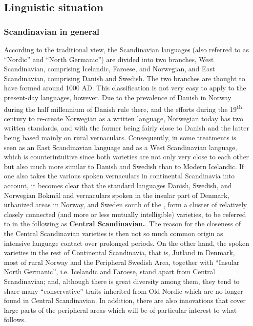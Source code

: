 \subsection[]{\rmfamily }
\clearpage\subsection[Linguistic situation]{\rmfamily Linguistic situation}
\subsubsection[Scandinavian in general]{\rmfamily Scandinavian in general}
According to the traditional view, the Scandinavian languages (also referred to as “Nordic” and “North Germanic”) are divided into two branches, West Scandinavian, comprising Icelandic, Faroese, and Norwegian, and East Scandinavian, comprising Danish and Swedish. The two branches are thought to have formed around 1000 AD. This classification is not very easy to apply to the present-day languages, however. Due to the prevalence of Danish in Norway during the half millennium of Danish rule there, and the efforts during the 19\textsuperscript{th} century to re-create Norwegian as a written language, Norwegian today has two written standards,  and  with the former being fairly close to Danish and the latter being based mainly on rural vernaculars. Consequently, in some treatments  is seen as an East Scandinavian language and  as a West Scandinavian language, which is counterintuitive since both varieties are not only very close to each other but also much more similar to Danish and Swedish than to Modern Icelandic. If one also takes the various spoken vernaculars in continental Scandinavia into account, it becomes clear that the standard languages Danish, Swedish, and Norwegian Bokmål and vernaculars spoken in the insular part of Denmark, urbanized areas in Norway, and Sweden south of the , form a cluster of relatively closely connected (and more or less mutually intelligible) varieties, to be referred to in the following as \textbf{Central Scandinavian}\textbf{.}. The reason for the closeness of the Central Scandinavian varieties is then not so much common origin as intensive language contact over prolonged periods. On the other hand, the spoken varieties in the rest of Continental Scandinavia, that is, Jutland in Denmark, most of rural Norway and the Peripheral Swedish Area, together with “Insular North Germanic”, i.e. Icelandic and Faroese, stand apart from Central Scandinavian; and, although there is great diversity among them, they tend to share many “conservative” traits inherited from Old Nordic which are no longer found in Central Scandinavian. In addition, there are also innovations that cover large parts of the peripheral areas which will be of particular interest to what follows. 

